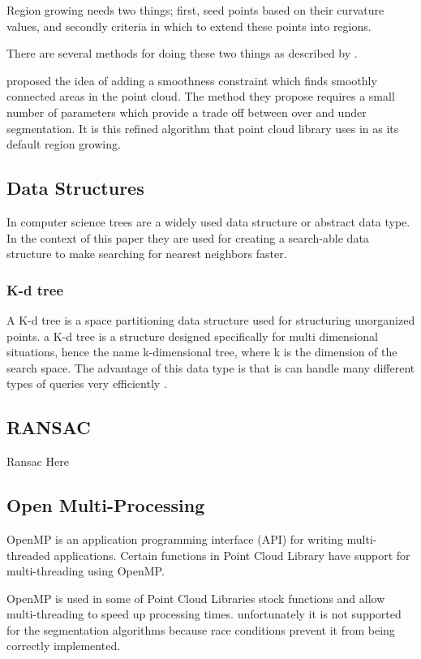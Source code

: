 			Region growing needs two things; first, seed points based on their curvature values, and secondly criteria in which to extend these points into regions.
			
			There are several methods for doing these two things as described by \cite{hoover_experimental_1996}.		
			
			\cite{rabbani_segmentation_2006} proposed the idea of adding a smoothness constraint which finds smoothly connected areas in the point cloud. The method they propose requires a small number of parameters which provide a trade off between over and under segmentation. It is this refined algorithm that point cloud library uses in as its default region growing.
			
			
	\subsection{Data Structures}
		In computer science trees are a widely used data structure or abstract data type. In the context of this paper they are used for creating a search-able data structure to make searching for nearest neighbors faster.
		
		\subsubsection{K-d tree}
			A K-d tree is a space partitioning data structure used for structuring unorganized points. a K-d tree is a structure designed specifically for multi dimensional situations, hence the name k-dimensional tree, where k is the dimension of the search space. The advantage of this data type is that is can handle many different types of queries very efficiently \citep{bentley_multidimensional_1975}.
			
			
			
	\subsection{RANSAC}
		Ransac Here
			
			
			
			
	
	\subsection{Open Multi-Processing}
		OpenMP is an application programming interface (API) for writing multi-threaded applications. Certain functions in Point Cloud Library have support for multi-threading using OpenMP.
		
		OpenMP is used in some of Point Cloud Libraries stock functions and allow multi-threading to speed up processing times. unfortunately it is not supported for the segmentation algorithms because race conditions prevent it from being correctly implemented. 

		
		
		
		
		
		
		
		
		
		